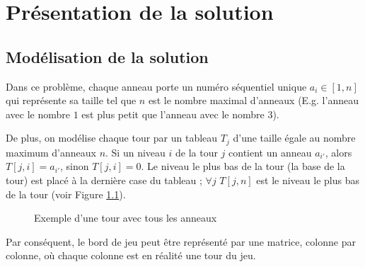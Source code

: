 \chapter{Présentation de la solution}

\section{Modélisation de la solution}
Dans ce problème, chaque anneau porte un numéro séquentiel unique $a_i \in [1, n]$ qui représente sa taille tel que $n$ est le nombre maximal d'anneaux (E.g. l'anneau avec le nombre $1$ est plus petit que l'anneau avec le nombre $3$).
\par
De plus, on modélise chaque tour par un tableau $T_j$ d'une taille égale au nombre maximum d'anneaux $n$. Si un niveau $i$ de la tour $j$ contient un anneau $a_{i'}$, alors $T[j, i] = a_{i'}$, sinon $T[j, i] = 0$. Le niveau le plus bas de la tour (la base de la tour) est placé à la dernière case du tableau ; $\forall j$ $T[j, n]$ est le niveau le plus bas de la tour (voir Figure \ref{fig:rep_tour}).

\begin{figure}[h!]
    \begin{center}
        \caption{Exemple d'une tour avec tous les anneaux}
        \label{fig:rep_tour}
    \end{center}
\end{figure}

\par
Par conséquent, le bord de jeu peut être représenté par une matrice, colonne par colonne, où chaque colonne est en réalité une tour du jeu.

